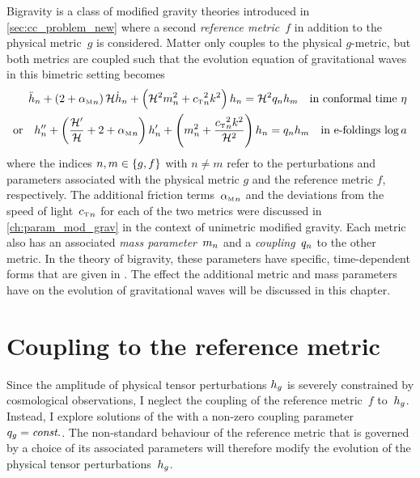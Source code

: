 \documentclass[12pt,parskip=half]{scrreprt}
\begin{document}
Bigravity is a class of modified gravity theories introduced in \autoref{sec:cc_problem_new} where a second \emph{reference metric}~\(f\) in addition to the physical metric~\(g\) is considered. Matter only couples to the physical \(g\)-metric, but both metrics are coupled such that the evolution equation of gravitational waves in this bimetric setting becomes \citep{Amendola2015}
\begin{subequations}\label{eq:evolution_bimetric}
\begin{align}
	\ddconf{h}\ofmetr{n} + \del{2 + \alphaMofmetr{n}} \Hconf \dconf{h}\ofmetr{n} + \del{\Hconf^2 \mofmetr{n}^2 + \cTofmetr{n}^2 k^2} h\ofmetr{n} = \Hconf^2 \qofmetr{n} h\ofmetr{m} \quad \text{in conformal time \(\conft\)} \\
    \text{or} \quad \ddefold{h}\ofmetr{n} + \del{\frac{\defold{\Hconf}}{\Hconf} + 2 + \alphaMofmetr{n}} \defold{h}\ofmetr{n} + \del{\mofmetr{n}^2 + \frac{\cTofmetr{n}^2 k^2}{\Hconf^2}} h\ofmetr{n} = \qofmetr{n} h\ofmetr{m} \quad \text{in e-foldings \(\efold\)}
\end{align}
\end{subequations}
where the indices \(n,m \in \cbr{g,f}\) with \(n \neq m\) refer to the perturbations and parameters associated with the physical metric \(g\) and the reference metric \(f\), respectively. The additional friction terms~\({\alpha_{\textnormal{\tiny{M}}}}_{n}\) and the deviations from the speed of light~\({c_{\textnormal{\tiny{T}}}}_{n}\) for each of the two metrics were discussed in \autoref{ch:param_mod_grav} in the context of unimetric modified gravity. Each metric also has an associated \emph{mass parameter}~\(m_{n}\) and a \emph{coupling}~\(q_{n}\) to the other metric. In the theory of bigravity, these parameters have specific, time-dependent forms that are given in \cite{Amendola2015}. The effect the additional metric and mass parameters have on the evolution of gravitational waves will be discussed in this chapter.

\section{Coupling to the reference metric}\label{sec:bimetric_coupling}

Since the amplitude of physical tensor perturbations \(h_{g}\) is severely constrained by cosmological observations, I neglect the coupling of the reference metric~\(f\) to~\(h_{g}\). Instead, I explore solutions of the  with a non-zero coupling parameter~\(q_{g}=\textnormal{\textit{const.}}\). The non-standard behaviour of the reference metric that is governed by a choice of its associated parameters will therefore modify the evolution of the physical tensor perturbations~\(h_{g}\). 
\end{document}
